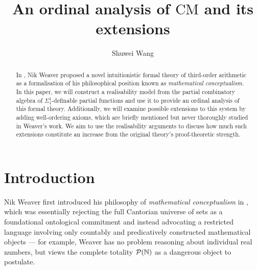 \documentclass[11pt]{article}
\title{An ordinal analysis of $\mathrm{CM}$ and its extensions}
\author{Shuwei Wang}
\date{\DTMdate{2025-01-21}}
\theoremstyle{plain}
\theoremstyle{definition}
\begin{document}
\maketitle

\begin{abstract}
    In \cite{weaver09-cm}, Nik Weaver proposed a novel intuitionistic formal theory of third-order arithmetic as a formalisation of his philosophical position known as \emph{mathematical conceptualism}. In this paper, we will construct a realisability model from the partial combinatory algebra of $\Sigma^1_1$-definable partial functions and use it to provide an ordinal analysis of this formal theory. Additionally, we will examine possible extensions to this system by adding well-ordering axioms, which are briefly mentioned but never thoroughly studied in Weaver's work. We aim to use the realisability arguments to discuss how much such extensions constitute an increase from the original theory's proof-theoretic strength.
\end{abstract}

\tableofcontents

\section{Introduction}

Nik Weaver first introduced his philosophy of \emph{mathematical conceptualism} in \cite{weaver05-conceptualism}, which was essentially rejecting the full Cantorian universe of sets as a foundational ontological commitment and instead advocating a restricted language involving only countably and predicatively constructed mathematical objects --- for example, Weaver has no problem reasoning about individual real numbers, but views the complete totality $\mathcal{P}\mleft(\mathbb{N}\mright)$ as a dangerous object to postulate.
\end{document}
